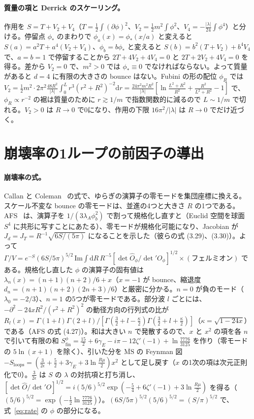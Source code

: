 \documentclass[a4paper,10pt]{ltjsarticle}
\newcommand{\dd}{\mathrm{d}}
\newcommand{\MSbar}{\overline{\mathrm{MS}}}
\begin{document}
\paragraph{質量の項と Derrick のスケーリング。}作用を $S=T+V_2+V_4$（$T=\frac12\int(\partial\phi)^2$、$V_2=\frac12m^2\int\phi^2$、$V_4=-\frac{|\lambda|}{24}\int\phi^4$）と分ける。停留点 $\phi_*$ のまわりで $\phi_a(x)=\phi_*(x/a)$ と変えると $S(a)=a^2T+a^4(V_2+V_4)$、$\phi_b=b\phi_*$ と変えると $S(b)=b^2(T+V_2)+b^4V_4$ で、$a=b=1$ で停留することから $2T+4V_2+4V_4=0$ と $2T+2V_2+4V_4=0$ を得る。差から $V_2=0$ で、$m^2>0$ では $\phi_*\equiv0$ でなければならない。よって質量があると $d=4$ に有限の大きさの bounce はない。Fubini の形の配位 $\phi_R$ では $V_2=\frac12m^2\cdot2\pi^2\frac{48R^2}{|\lambda|}\int_0^Lr^3(r^2+R^2)^{-2}\dd r=\frac{24\pi^2m^2R^2}{|\lambda|}[\ln\frac{L^2+R^2}{R^2}+\frac{R^2}{L^2+R^2}-1]$ で、$\phi_R\propto r^{-2}$ の裾は質量のために $r\gtrsim1/m$ で指数関数的に減るので $L\sim1/m$ で切れる。$V_2>0$ は $R\to0$ で0になり、作用の下限 $16\pi^2/|\lambda|$ は $R\to0$ でだけ近づく。

\section{崩壊率の1ループの前因子の導出}\label{app:prefactor}

\paragraph{崩壊率の式。}Callan と Coleman~\cite{callancoleman} の式で、ゆらぎの演算子の零モードを集団座標に換える。スケール不変な bounce の零モードは、並進の4つと大きさ $R$ の1つである。AFS~\cite{afs} は、演算子を $1/(3\lambda_A\phi_b^2)$ で割って規格化し直すと（Euclid 空間を球面 $S^4$ に共形に写すことにあたる）、零モードが規格化可能になり、Jacobian が $J_d=J_T=R^{-1}\sqrt{6S/(5\pi)}$ になることを示した（彼らの式 (3.29)、(3.30)）。よって $\Gamma/V=e^{-S}(6S/5\pi)^{5/2}\,\mathrm{Im}\int\dd R\,R^{-5}[\det\hat O_\phi/\det'O_\phi]^{1/2}\times(\text{フェルミオン})$ である。規格化し直した $\phi$ の演算子の固有値は $\lambda_n(x)=(n+1)(n+2)/6+x$（$x=-1$ が bounce、縮退度 $d_n=(n+1)(n+2)(2n+3)/6$）と厳密に分かる。$n=0$ が負のモード（$\lambda_0=-2/3$）、$n=1$ の5つが零モードである。部分波 $l$ ごとには、$-\partial^2-24xR^2/(r^2+R^2)^2$ の動径方向の行列式の比が $R_l(x)=\Gamma(1+l)\Gamma(2+l)/[\Gamma(\frac32+l-\frac\kappa2)\Gamma(\frac32+l+\frac\kappa2)]$（$\kappa=\sqrt{1-24x}$）である（AFS の式 (4.27)）。和は大きい $n$ で発散するので、$x$ と $x^2$ の項を各 $n$ で引いて有限の和 $S^\phi_{\mathrm{fin}}=\frac{15}{2}+6\gamma_E-i\pi-12\zeta'(-1)+\ln\frac{7776}{3125}$ を作り（零モードの $5\ln(x+1)$ を除く）、引いた分を $\MSbar$ の Feynman 図 $-S_{\mathrm{loops}}=(\frac{3}{2\epsilon}+\frac52+3\gamma_E+3\ln\frac{R\mu}{2})x^2$ として足し戻す（$x$ の1次の項は次元正則化で0）。$\frac{3}{2\epsilon}$ は $S$ の $\lambda$ の対抗項と打ち消し、$[\det\hat O/\det'O]^{1/2}=i(5/6)^{5/2}\exp(-\frac54+6\zeta'(-1)+3\ln\frac{R\mu}{2})$ を得る（$(5/6)^{5/2}=\exp(-\frac12\ln\frac{7776}{3125})$）。$(6S/5\pi)^{5/2}(5/6)^{5/2}=(S/\pi)^{5/2}$ で、式~\eqref{eq:rate} の $\phi$ の部分になる。
\end{document}
